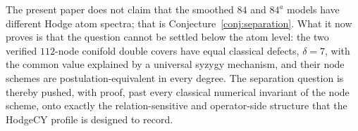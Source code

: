 The present paper does not claim that the smoothed $84$ and $84^{a}$ models
have different Hodge atom spectra; that is Conjecture~\ref{conj:separation}.
What it now proves is that the question cannot be settled below the atom
level: the two verified $112$-node conifold double covers have equal
classical defects, $\delta = 7$, with the common value explained by a
universal syzygy mechanism, and their node schemes are
postulation-equivalent in every degree. The separation question is thereby
pushed, with proof, past every classical numerical invariant of the node
scheme, onto exactly the relation-sensitive and operator-side structure
that the HodgeCY profile is designed to record.

%
%
%
%

%
